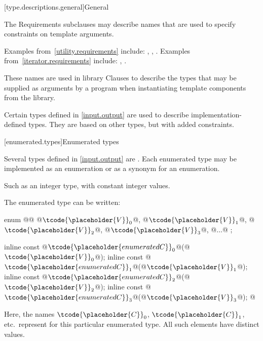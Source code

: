 [type.descriptions.general]{General}

\pnum
The Requirements subclauses may describe names that are used to specify
constraints on template arguments.
\begin{footnote}
Examples
from~\ref{utility.requirements} include:
,
,
.
Examples from~\ref{iterator.requirements} include:
,
.
\end{footnote}
These names are used in library Clauses
to describe the types that
may be supplied as arguments by a \Cpp{} program when instantiating template components from
the library.

\pnum
Certain types defined in \ref{input.output} are used to describe implementation-defined types.
%
They are based on other types, but with added constraints.

[enumerated.types]{Enumerated types}

\pnum
Several types defined in \ref{input.output} are
.
Each enumerated type may be implemented as an enumeration or as a synonym for
an enumeration.
\begin{footnote}
Such as an integer type, with constant integer
values.
\end{footnote}

\pnum
The enumerated type  can be written:

\begin{codeblock}
enum @@ { @$\tcode{\placeholder{V}}_{0}$@, @$\tcode{\placeholder{V}}_{1}$@, @$\tcode{\placeholder{V}}_{2}$@, @$\tcode{\placeholder{V}}_{3}$@, @$\ldots$@ };

inline const @$\tcode{\placeholder{enumerated C}}_{0}$@(@$\tcode{\placeholder{V}}_{0}$@);
inline const @$\tcode{\placeholder{enumerated C}}_{1}$@(@$\tcode{\placeholder{V}}_{1}$@);
inline const @$\tcode{\placeholder{enumerated C}}_{2}$@(@$\tcode{\placeholder{V}}_{2}$@);
inline const @$\tcode{\placeholder{enumerated C}}_{3}$@(@$\tcode{\placeholder{V}}_{3}$@);
  @\vdots@
\end{codeblock}

\pnum
Here, the names $\tcode{\placeholder{C}}_0$,
$\tcode{\placeholder{C}}_1$, etc.\ represent
for this particular enumerated type.
%
All such elements have distinct values.

